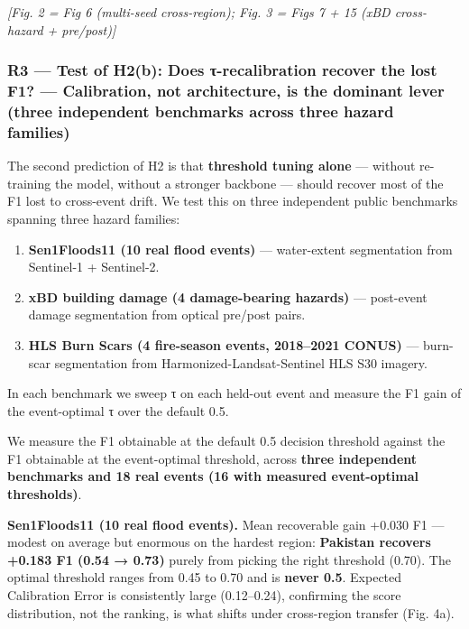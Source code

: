 \emph{{[}Fig. 2 = Fig 6 (multi-seed cross-region); Fig. 3 = Figs 7 + 15 (xBD cross-
hazard + pre/post){]}}

\subsubsection{R3 --- Test of H2(b): Does τ-recalibration recover the lost F1? --- Calibration, not architecture, is the dominant lever (three independent benchmarks across three hazard families)}\label{r3-test-of-h2b-does-ux3c4-recalibration-recover-the-lost-f1-calibration-not-architecture-is-the-dominant-lever-three-independent-benchmarks-across-three-hazard-families}

The second prediction of H2 is that \textbf{threshold tuning alone} --- without
re-training the model, without a stronger backbone --- should recover most
of the F1 lost to cross-event drift. We test this on three independent
public benchmarks spanning three hazard families:

\begin{enumerate}
\def\labelenumi{\arabic{enumi}.}
\tightlist
\item
  \textbf{Sen1Floods11 (10 real flood events)} --- water-extent segmentation
  from Sentinel-1 + Sentinel-2.
\item
  \textbf{xBD building damage (4 damage-bearing hazards)} --- post-event
  damage segmentation from optical pre/post pairs.
\item
  \textbf{HLS Burn Scars (4 fire-season events, 2018--2021 CONUS)} --- burn-
  scar segmentation from Harmonized-Landsat-Sentinel HLS S30 imagery.
\end{enumerate}

In each benchmark we sweep τ on each held-out event and measure the F1
gain of the event-optimal τ over the default 0.5.

We measure the F1 obtainable at the default 0.5 decision threshold against
the F1 obtainable at the event-optimal threshold, across \textbf{three independent
benchmarks and 18 real events (16 with measured event-optimal thresholds)}.

\textbf{Sen1Floods11 (10 real flood events).} Mean recoverable gain +0.030 F1 ---
modest on average but enormous on the hardest region: \textbf{Pakistan recovers
+0.183 F1 (0.54 → 0.73)} purely from picking the right threshold (0.70).
The optimal threshold ranges from 0.45 to 0.70 and is \textbf{never 0.5}.
Expected Calibration Error is consistently large (0.12--0.24), confirming the
score distribution, not the ranking, is what shifts under cross-region
transfer (Fig. 4a).

